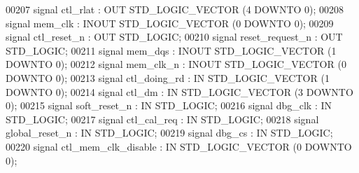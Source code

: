 \begin{DoxyCode}
00207         \textcolor{keywordflow}{signal} ctl_rlat : \textcolor{keywordflow}{OUT} \textcolor{comment}{STD\_LOGIC\_VECTOR} (\textcolor{vhdllogic}{}\textcolor{vhdllogic}{4} \textcolor{keywordflow}{DOWNTO} \textcolor{vhdllogic}{}\textcolor{vhdllogic}{0});
00208         \textcolor{keywordflow}{signal} mem_clk : \textcolor{keywordflow}{INOUT} \textcolor{comment}{STD\_LOGIC\_VECTOR} (\textcolor{vhdllogic}{}\textcolor{vhdllogic}{0} \textcolor{keywordflow}{DOWNTO} \textcolor{vhdllogic}{}\textcolor{vhdllogic}{0});
00209         \textcolor{keywordflow}{signal} ctl_reset_n : \textcolor{keywordflow}{OUT} \textcolor{comment}{STD\_LOGIC};
00210         \textcolor{keywordflow}{signal} reset_request_n : \textcolor{keywordflow}{OUT} \textcolor{comment}{STD\_LOGIC};
00211         \textcolor{keywordflow}{signal} mem_dqs : \textcolor{keywordflow}{INOUT} \textcolor{comment}{STD\_LOGIC\_VECTOR} (\textcolor{vhdllogic}{}\textcolor{vhdllogic}{1} \textcolor{keywordflow}{DOWNTO} \textcolor{vhdllogic}{}\textcolor{vhdllogic}{0});
00212         \textcolor{keywordflow}{signal} mem_clk_n : \textcolor{keywordflow}{INOUT} \textcolor{comment}{STD\_LOGIC\_VECTOR} (\textcolor{vhdllogic}{}\textcolor{vhdllogic}{0} \textcolor{keywordflow}{DOWNTO} \textcolor{vhdllogic}{}\textcolor{vhdllogic}{0});
00213         \textcolor{keywordflow}{signal} ctl_doing_rd : \textcolor{keywordflow}{IN} \textcolor{comment}{STD\_LOGIC\_VECTOR} (\textcolor{vhdllogic}{}\textcolor{vhdllogic}{1} \textcolor{keywordflow}{DOWNTO} \textcolor{vhdllogic}{}\textcolor{vhdllogic}{0});
00214         \textcolor{keywordflow}{signal} ctl_dm : \textcolor{keywordflow}{IN} \textcolor{comment}{STD\_LOGIC\_VECTOR} (\textcolor{vhdllogic}{}\textcolor{vhdllogic}{3} \textcolor{keywordflow}{DOWNTO} \textcolor{vhdllogic}{}\textcolor{vhdllogic}{0});
00215         \textcolor{keywordflow}{signal} soft_reset_n : \textcolor{keywordflow}{IN} \textcolor{comment}{STD\_LOGIC};
00216         \textcolor{keywordflow}{signal} dbg_clk : \textcolor{keywordflow}{IN} \textcolor{comment}{STD\_LOGIC};
00217         \textcolor{keywordflow}{signal} ctl_cal_req : \textcolor{keywordflow}{IN} \textcolor{comment}{STD\_LOGIC};
00218         \textcolor{keywordflow}{signal} global_reset_n : \textcolor{keywordflow}{IN} \textcolor{comment}{STD\_LOGIC};
00219         \textcolor{keywordflow}{signal} dbg_cs : \textcolor{keywordflow}{IN} \textcolor{comment}{STD\_LOGIC};
00220         \textcolor{keywordflow}{signal} ctl_mem_clk_disable : \textcolor{keywordflow}{IN} \textcolor{comment}{STD\_LOGIC\_VECTOR} (\textcolor{vhdllogic}{}\textcolor{vhdllogic}{0} \textcolor{keywordflow}{DOWNTO} \textcolor{vhdllogic}{}\textcolor{vhdllogic}{0});

\end{DoxyCode}
